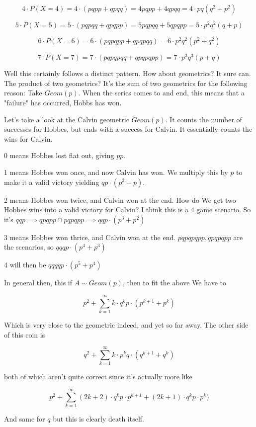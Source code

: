 \documentclass{article}
\begin{document}
		\[ 4 \cdot P(X = 4) = 4\cdot (pqpp + qpqq) = 4pqpp + 4qpqq = 4\cdot pq(q^2+p^2)\]
		
		\[ 5 \cdot P(X = 5) = 5\cdot (pqpqq + qpqpp) = 5pqpqq + 5qpqpp = 5\cdot p^2q^2(q+p)\]
		
		\[ 6 \cdot P(X = 6) = 6\cdot (pqpqpp+ qpqpqq) = 6\cdot p^2q^2(p^2+q^2)\]

		\[ 7 \cdot P(X = 7) = 7\cdot (pqpqpqq + qpqpqpp) = 7\cdot p^3q^3(p+q) \]		
		
		Well this certainly follows a distinct pattern. How about geometrics? It sure can. The product of two geometrics? It's the sum of two geometrics for the following reason: Take $Geom(p)$. When the series comes to and end, this means that a "failure" has occurred, Hobbs has won.
		
		Let's take a look at the Calvin geometric $Geom(p)$. It counts the number of successes for Hobbes, but ends with a success for Calvin. It essentially counts the wins for Calvin.
		
		0 means Hobbes lost flat out, giving $pp$. 
		
		1 means Hobbes won once, and now Calvin has won. We multiply this by $p$ to make it a valid victory yielding $qp\cdot (p^2+p)$.
		
		2 means Hobbes won twice, and Calvin won at the end. How do We get two Hobbes wins into a valid victory for Calvin? I think this is a 4 game scenario. So it's $qqp \implies qpqpp\cap pqpqpp\implies qqp\cdot (p^3+p^2)$
		
		3 means Hobbes won thrice, and Calvin won at the end. $pqpqpqpp, qpqpqpp$ are the scenarios, so $ qqqp\cdot (p^4+p^3)$  
		
		4 will then be $qqqqp\cdot (p^5+p^4)$
		
		In general then, this if $A\sim Geom(p)$, then to fit the above We  have to
		
		\[ p^2 + \sum^\infty_{k=1}k\cdot q^kp\cdot (p^{k+1}+p^k) \]
		
		Which is very close to the geometric indeed, and yet so far away. The other side of this coin is
		
		\[ q^2 + \sum^\infty_{k=1}k\cdot p^kq\cdot (q^{k+1}+q^k) \]
		
		both of which aren't quite correct since it's actually more like
		
		\[ p^2 + \sum^\infty_{k=1}(2k+2)\cdot q^kp\cdot p^{k+1}+(2k+1)\cdot q^kp \cdot p^k) \]

		And same for $q$ but this is clearly death itself.
		
\end{document}
